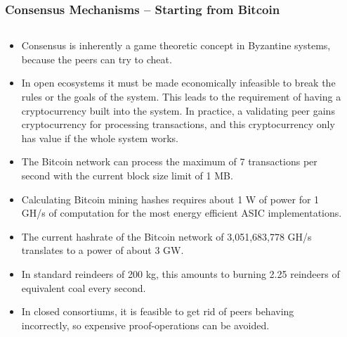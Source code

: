 \documentclass[8pt]{beamer}
\begin{document}
\begin{frame}
\frametitle{Consensus Mechanisms – Starting from Bitcoin}

\begin{columns}
\begin{column}{0.9\textwidth}

\begin{itemize}
 \item Consensus is inherently a game theoretic concept in Byzantine systems, because the peers can try to cheat.
 \item In open ecosystems it must be made economically infeasible to break the rules or the goals of the system. This leads to the requirement of having a cryptocurrency built into the system.
       In practice, a validating peer gains cryptocurrency for processing transactions, and this cryptocurrency only has value if the whole system works.
 \item The Bitcoin network can process the maximum of 7 transactions per second with the current block size limit of 1 MB.
 \item Calculating Bitcoin mining hashes requires about 1 W of power for 1 GH/s of computation for the most energy efficient ASIC implementations.
 \item The current hashrate of the Bitcoin network of 3,051,683,778 GH/s translates to a power of about 3 GW.
 \item In standard reindeers of 200 kg, this amounts to burning 2.25 reindeers of equivalent coal every second.
 \item In closed consortiums, it is feasible to get rid of peers behaving incorrectly, so expensive proof-operations can be avoided.
\end{itemize}
\end{column}
\begin{column}{0.1\textwidth}

\end{column}
\end{columns}
\end{frame}
\end{document}
